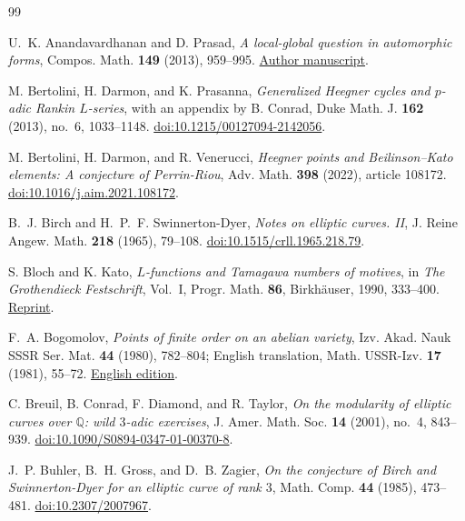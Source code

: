 \begin{thebibliography}{99}

U.~K. Anandavardhanan and D. Prasad,
\emph{A local-global question in automorphic forms},
Compos. Math. \textbf{149} (2013), 959--995.
\href{https://www.math.iitb.ac.in/~dprasad/comp2013.pdf}{Author manuscript}.

M. Bertolini, H. Darmon, and K. Prasanna,
\emph{Generalized Heegner cycles and $p$-adic Rankin $L$-series},
with an appendix by B. Conrad,
Duke Math. J. \textbf{162} (2013), no.~6, 1033--1148.
\href{https://doi.org/10.1215/00127094-2142056}{doi:10.1215/00127094-2142056}.

M. Bertolini, H. Darmon, and R. Venerucci,
\emph{Heegner points and Beilinson--Kato elements: A conjecture of Perrin-Riou},
Adv. Math. \textbf{398} (2022), article 108172.
\href{https://doi.org/10.1016/j.aim.2021.108172}{doi:10.1016/j.aim.2021.108172}.

B.~J. Birch and H.~P.~F. Swinnerton-Dyer,
\emph{Notes on elliptic curves. II},
J. Reine Angew. Math. \textbf{218} (1965), 79--108.
\href{https://doi.org/10.1515/crll.1965.218.79}{doi:10.1515/crll.1965.218.79}.

S. Bloch and K. Kato,
\emph{$L$-functions and Tamagawa numbers of motives},
in \emph{The Grothendieck Festschrift}, Vol.~I,
Progr. Math. \textbf{86}, Birkh\"auser, 1990, 333--400.
\href{https://doi.org/10.1007/978-0-8176-4574-8_9}{Reprint}.

F.~A. Bogomolov,
\emph{Points of finite order on an abelian variety},
Izv. Akad. Nauk SSSR Ser. Mat. \textbf{44} (1980), 782--804;
English translation, Math. USSR-Izv. \textbf{17} (1981), 55--72.
\href{https://doi.org/10.1070/IM1981v017n01ABEH001329}{English edition}.

C. Breuil, B. Conrad, F. Diamond, and R. Taylor,
\emph{On the modularity of elliptic curves over $\mathbb Q$: wild $3$-adic exercises},
J. Amer. Math. Soc. \textbf{14} (2001), no.~4, 843--939.
\href{https://doi.org/10.1090/S0894-0347-01-00370-8}{doi:10.1090/S0894-0347-01-00370-8}.

J.~P. Buhler, B.~H. Gross, and D.~B. Zagier,
\emph{On the conjecture of Birch and Swinnerton-Dyer for an elliptic curve of rank $3$},
Math. Comp. \textbf{44} (1985), 473--481.
\href{https://doi.org/10.2307/2007967}{doi:10.2307/2007967}.


\end{thebibliography}
